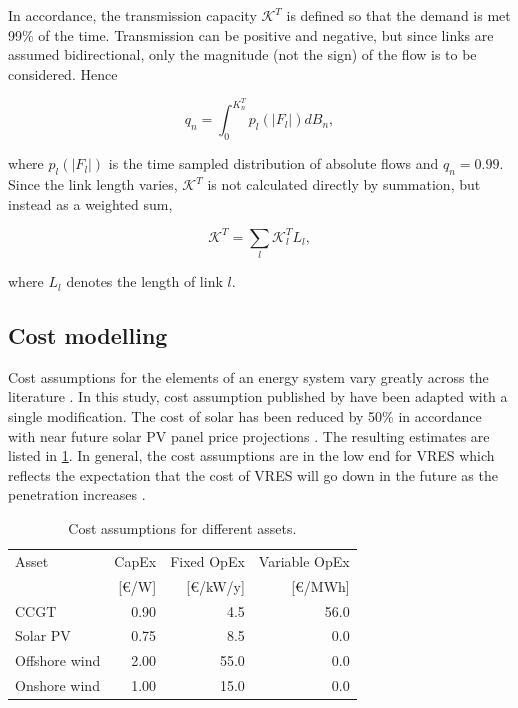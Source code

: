 \documentclass[a4paper, 5p, sort&compress]{elsarticle}%
\begin{document}
In accordance, the transmission capacity $\mathcal{K}^{T}$ is defined
so that the demand is met 99\% of the time. Transmission can be
positive and negative, but since links are assumed bidirectional, only
the magnitude (not the sign) of the flow is to be considered. Hence

\begin{equation}
  \label{eq:2}
  q_{n} = \int _{0} ^{K_{n}^{T}} p_{l}(|F_{l}|)dB_{n},
\end{equation}

where $p_{l}(|F_{l}|)$ is the time sampled distribution of absolute
flows and $q_{n} = 0.99$. Since the link length varies,
$\mathcal{K}^{T}$ is not calculated directly by summation, but instead
as a weighted sum,

\begin{equation}
  \label{eq:4}
  \mathcal{K}^{T} = \sum_{l} \mathcal{K}^{T}_{l} L_{l},
\end{equation}

where $L_{l}$ denotes the length of link $l$.


\subsection{Cost modelling}
\label{sec:cost-modelling}

Cost assumptions for the elements of an energy system vary greatly
across the literature \cite{Sensitivity}. In this study, cost
assumption published by \cite{Rolando} have been adapted with a single
modification. The cost of solar has been reduced by 50\% in accordance
with near future solar PV panel price projections \cite{irena}. The
resulting estimates are listed in \cref{tab:cost-assumptions}. In
general, the cost assumptions are in the low end for VRES which
reflects the expectation that the cost of VRES will go down in the
future as the penetration increases \cite{Fraunhofer}.

\begin{table}[h!]
  \centering
  \caption{Cost assumptions for different assets.}
  \label{tab:cost-assumptions}
  \begin{tabular}{lrrr}  \toprule
    Asset & CapEx & Fixed OpEx & Variable OpEx\\
    & [€/W] & [€/kW/y] & [€/MWh]\\ \midrule
    CCGT & 0.90 & 4.5 & 56.0\\
    Solar PV & 0.75 & 8.5 & 0.0\\
    Offshore wind & 2.00 & 55.0 & 0.0\\
    Onshore wind & 1.00 & 15.0 & 0.0\\
    \bottomrule
  \end{tabular}
\end{table}
\end{document}
